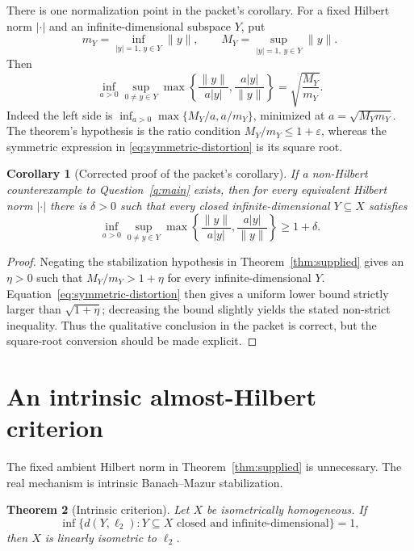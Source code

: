\documentclass[11pt]{article}
\newtheorem{theorem}{Theorem}[section]
\newtheorem{corollary}[theorem]{Corollary}
\theoremstyle{definition}
\begin{document}
There is one normalization point in the packet's corollary.  For a fixed
Hilbert norm $|\cdot|$ and an infinite-dimensional subspace $Y$, put
\[
 m_Y=\inf_{|y|=1,\,y\in Y}\|y\|,
 \qquad
 M_Y=\sup_{|y|=1,\,y\in Y}\|y\|.
\]
Then
\begin{equation}\label{eq:symmetric-distortion}
 \inf_{a>0}\sup_{0\ne y\in Y}
 \max\left\{\frac{\|y\|}{a|y|},\frac{a|y|}{\|y\|}\right\}
 =\sqrt{\frac{M_Y}{m_Y}}.
\end{equation}
Indeed the left side is $\inf_{a>0}\max\{M_Y/a,a/m_Y\}$, minimized at
$a=\sqrt{M_Ym_Y}$.  The theorem's hypothesis is the ratio condition
$M_Y/m_Y\leq1+\varepsilon$, whereas the symmetric expression in
\eqref{eq:symmetric-distortion} is its square root.

\begin{corollary}[Corrected proof of the packet's corollary]\label{cor:packet}
If a non-Hilbert counterexample to Question~\ref{q:main} exists, then for every
equivalent Hilbert norm $|\cdot|$ there is $\delta>0$ such that every closed
infinite-dimensional $Y\subseteq X$ satisfies
\[
 \inf_{a>0}\sup_{0\ne y\in Y}
 \max\left\{\frac{\|y\|}{a|y|},\frac{a|y|}{\|y\|}\right\}
 \geq1+\delta.
\]
\end{corollary}

\begin{proof}
Negating the stabilization hypothesis in Theorem~\ref{thm:supplied} gives an
$\eta>0$ such that $M_Y/m_Y>1+\eta$ for every infinite-dimensional $Y$.
Equation~\eqref{eq:symmetric-distortion} then gives a uniform lower bound
strictly larger than $\sqrt{1+\eta}$; decreasing the bound slightly yields the
stated non-strict inequality.  Thus the qualitative conclusion in the packet
is correct, but the square-root conversion should be made explicit.
\end{proof}

\section{An intrinsic almost-Hilbert criterion}\label{sec:intrinsic}

The fixed ambient Hilbert norm in Theorem~\ref{thm:supplied} is unnecessary.
The real mechanism is intrinsic Banach--Mazur stabilization.

\begin{theorem}[Intrinsic criterion]\label{thm:intrinsic}
Let $X$ be isometrically homogeneous.  If
\[
 \inf\{d(Y,\ell_2):Y\subseteq X\text{ closed and infinite-dimensional}\}=1,
\]
then $X$ is linearly isometric to $\ell_2$.
\end{theorem}
\end{document}
